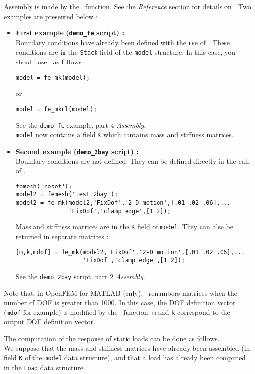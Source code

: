 Assembly is made by the \femk\ function. See the {\sl Reference} section for details on \femk. Two examples are presented below :
\begin{itemize}
\item \textbf{First example ({\tt demo\_fe} script) :}\\
Boundary conditions have already been defined with the use of \fecase. These conditions are in the {\tt Stack} field of the {\tt model} structure. In this case, you should use \femk\ as follows :
\begin{verbatim}
model = fe_mk(model);
\end{verbatim}

or

\begin{verbatim}
model = fe_mknl(model);
\end{verbatim}

See the {\tt demo\_fe} example, part 4 {\sl Assembly}.\\
{\tt model} now contains a field {\tt K} which contains mass and stiffness matrices.

\item \textbf{Second example ({\tt demo\_2bay} script) :}\\
Boundary conditions are not defined. They can be defined directly in the call of \femk.
\begin{verbatim}
femesh('reset');
model2 = femesh('test 2bay');
model2 = fe_mk(model2,'FixDof','2-D motion',[.01 .02 .06],...
               'FixDof','clamp edge',[1 2]);
\end{verbatim}
Mass and stiffness matrices are in the {\tt K} field of {\tt model}. They can also be returned in separate matrices :
\begin{verbatim}
[m,k,mdof] = fe_mk(model2,'FixDof','2-D motion',[.01 .02 .06],...
                   'FixDof','clamp edge',[1 2]);
\end{verbatim}
See the {\tt demo\_2bay} script, part 2 {\sl Assembly}.
\end{itemize}
Note that, in OpenFEM for MATLAB (only), \femk\ renumbers matrices when the number of DOF is greater than 1000. In this case, the DOF definition vector ({\tt mdof} for example) is modified by the \femk\ function. {\tt m} and {\tt k} correspond to the output DOF definition vector.

\newpage
The computation of the response of static loads can be done as follows. \\
We suppose that the mass and stiffness matrices have already been assembled (in field {\tt K} of the {\tt model} data structure), and that a load has already been computed in the {\tt Load} data structure. \\

